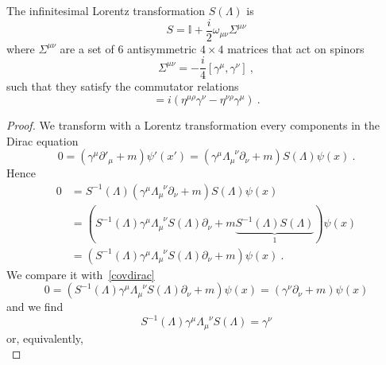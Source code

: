     The infinitesimal Lorentz transformation $S(\Lambda)$ is 
    \begin{equation*}
        S = \mathbb I + \frac{i}{2} \omega_{\mu\nu} \Sigma^{\mu\nu}
    \end{equation*}
    where $\Sigma^{\mu\nu}$ are a set of $6$ antisymmetric $4 \times 4$ matrices that act on spinors
    \begin{equation}\label{sigmas}
        \Sigma^{\mu\nu} = - \frac{i}{4} [\gamma^\mu, \gamma^\nu] ~,
    \end{equation}
    such that they satisfy the commutator relations 
    \begin{equation*}
        [\Sigma^{\mu\nu}, \gamma^\rho] = i (\eta^{\mu\rho} \gamma^\nu - \eta^{\nu\rho} \gamma^\mu) ~.
    \end{equation*}
    \begin{proof}
        We transform with a Lorentz transformation every components in the Dirac equation
        \begin{equation*}
            0 = (\gamma^\mu \partial'_\mu + m) \psi'(x') = (\gamma^\mu \Lambda_\mu^{\phantom \mu \nu} \partial_\nu + m) S(\Lambda) \psi(x) ~.
        \end{equation*}
        Hence 
        \begin{equation*}
        \begin{aligned}
            0 & = S^{-1}(\Lambda) (\gamma^\mu \Lambda_\mu^{\phantom \mu \nu} \partial_\nu + m) S(\Lambda) \psi(x) \\ & = (S^{-1}(\Lambda) \gamma^\mu \Lambda_\mu^{\phantom \mu \nu} S(\Lambda) \partial_\nu + m \underbrace{S^{-1} (\Lambda) S(\Lambda)}_1) \psi(x) \\ & = (S^{-1}(\Lambda) \gamma^\mu \Lambda_\mu^{\phantom \mu \nu} S(\Lambda) \partial_\nu + m) \psi(x) ~.
        \end{aligned}
        \end{equation*}
        We compare it with~\eqref{covdirac} 
        \begin{equation*}
            0 = (S^{-1}(\Lambda) \gamma^\mu \Lambda_\mu^{\phantom \mu \nu} S(\Lambda) \partial_\nu + m) \psi(x) = (\gamma^\nu \partial_\nu + m) \psi(x) 
        \end{equation*}
        and we find 
        \begin{equation*}
            S^{-1}(\Lambda) \gamma^\mu \Lambda_\mu^{\phantom \mu \nu} S(\Lambda) = \gamma^\nu
        \end{equation*}
        or, equivalently,
        \begin{equation*}

\end{equation*}
\end{proof}
